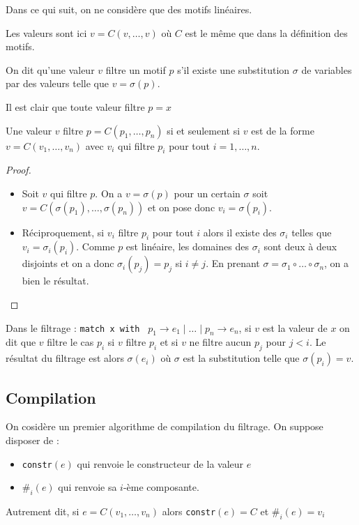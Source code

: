 \documentclass{cours}
\begin{document}
Dans ce qui suit, on ne considère que des motifs linéaires. 
\begin{definition}
    Les valeurs sont ici $v = C(v, \ldots, v)$ où $C$ est le même que dans la définition des motifs.
\end{definition}
\begin{definition}
    On dit qu'une valeur $v$ filtre un motif $p$ s'il existe une substitution $\sigma$ de variables par des valeurs telle que $v = \sigma(p)$.
\end{definition}

Il est clair que toute valeur filtre $p = x$
\begin{proposition}
    Une valeur $v$ filtre $p = C(p_{1}, \ldots, p_{n})$ si et seulement si $v$ est de la forme $v = C(v_{1},\ldots, v_{n})$ avec $v_{i}$ qui filtre $p_{i}$ pour tout $i = 1, \ldots, n$.
\end{proposition}
\begin{proof}
    \begin{itemize}
        \item Soit $v$ qui filtre $p$. On a $v = \sigma(p)$ pour un certain $\sigma$ soit $v = C(\sigma(p_{1}),\ldots, \sigma(p_{n}))$ et on pose donc $v_{i} = \sigma(p_{i})$.
        \item Réciproquement, si $v_{i}$ filtre $p_{i}$ pour tout $i$ alors il existe des $\sigma_{i}$ telles que $v_{i} = \sigma_{i}(p_{i})$. Comme $p$ est linéaire, les domaines des $\sigma_{i}$ sont deux à deux disjoints et on a donc $\sigma_{i}(p_{j}) = p_{j}$ si $i \neq j$. En prenant $\sigma = \sigma_{1} \circ \ldots \circ \sigma_{n}$, on a bien le résultat. 
    \end{itemize}
\end{proof}
\begin{definition}
    Dans le filtrage : \texttt{match x with } $p_{1} \rightarrow e_{1} \mid \ldots \mid p_{n} \rightarrow e_{n}$, si $v$ est la valeur de $x$ on dit que $v$ filtre le cas $p_{i}$ si $v$ filtre $p_{i}$ et si $v$ ne filtre aucun $p_{j}$ pour $j < i$. Le résultat du filtrage est alors $\sigma(e_{i})$ où $\sigma$ est la substitution telle que $\sigma(p_{i}) = v$.
\end{definition}

\subsection{Compilation}
On cosidère un premier algorithme de compilation du filtrage. On suppose disposer de :
\begin{itemize}
    \item \texttt{constr}$(e)$ qui renvoie le constructeur de la valeur $e$
    \item $\texttt{\#}_{i}(e)$ qui renvoie sa $i$-ème composante.
\end{itemize}
Autrement dit, si $e = C(v_{1}, \ldots, v_{n})$ alors \texttt{constr}$(e) = C$ et $\texttt{\#}_{i}(e) = v_{i}$
\end{document}
